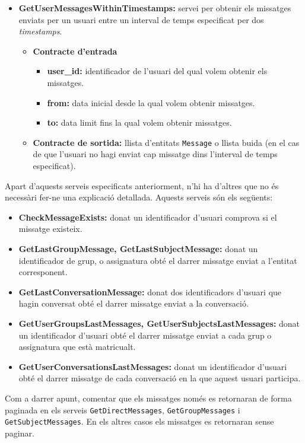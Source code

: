 \begin{itemize}
			\item \textbf{GetUserMessagesWithinTimestamps:} servei per obtenir els missatges enviats per un usuari entre un interval de temps especificat per dos \emph{timestamps}.
			
				\begin{itemize}
					\item \textbf{Contracte d'entrada}
						\begin{itemize}
							\item \textbf{user\_id:} identificador de l'usuari del qual volem obtenir els missatges.
							\item \textbf{from:} data inicial desde la qual volem obtenir missatges.
							\item \textbf{to:} data limit fins la qual volem obtenir missatges.
						\end{itemize}
					\item \textbf{Contracte de sortida:} llista d'entitats \texttt{Message} o llista buida (en el cas de que l'usuari no hagi enviat cap missatge dins l'interval de temps especificat).
			\end{itemize}
		\end{itemize}
		
	Apart d'aquests serveis especificats anteriorment, n'hi ha d'altres que no és necessàri fer-ne una explicació detallada. Aquests serveis són els següents:
	
	\begin{itemize}
		\item \textbf{CheckMessageExists:} donat un identificador d'usuari comprova si el missatge existeix.
		\item \textbf{GetLastGroupMessage, GetLastSubjectMessage:} donat un identificador de grup, o assignatura obté el darrer missatge enviat a l'entitat corresponent.
		\item \textbf{GetLastConversationMessage:} donat dos identificadors d'usuari que hagin conversat obté el darrer missatge enviat a la conversació.
		\item \textbf{GetUserGroupsLastMessages, GetUserSubjectsLastMessages:} donat un identificador d'usuari obté el darrer missatge enviat a cada grup o assignatura que està matricualt.
		\item \textbf{GetUserConversationsLastMessages:} donat un identificador d'usuari obté el darrer missatge de cada conversació en la que aquest usuari participa.
	\end{itemize}
	
	Com a darrer apunt, comentar que els missatges només es retornaran de forma paginada en els serveis \texttt{GetDirectMessages}, \texttt{GetGroupMessages} i \texttt{GetSubjectMessages}. En els altres casos els missatges es retornaran sense paginar.

